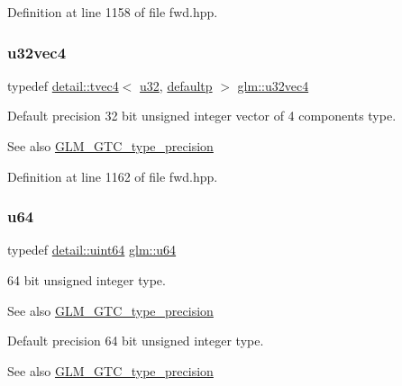 Definition at line 1158 of file fwd.\+hpp.

\mbox{\label{group__gtc__type__precision_ga7e4574f8327a2f576baf2617343d0170}} 
\subsubsection{\texorpdfstring{u32vec4}{u32vec4}}
{\footnotesize\ttfamily typedef \hyperlink{structglm_1_1detail_1_1tvec4}{detail\+::tvec4}$<$ \hyperlink{group__gtc__type__precision_ga54e837745059fd29017bed71cfa0a8db}{u32}, \hyperlink{namespaceglm_a0f04f086094c747d227af4425893f545a9d21ccd8b5a009ec7eb7677befc3bf51}{defaultp} $>$ \hyperlink{group__gtc__type__precision_ga7e4574f8327a2f576baf2617343d0170}{glm\+::u32vec4}}

Default precision 32 bit unsigned integer vector of 4 components type. \begin{DoxySeeAlso}{See also}
\hyperlink{group__gtc__type__precision}{G\+L\+M\+\_\+\+G\+T\+C\+\_\+type\+\_\+precision} 
\end{DoxySeeAlso}


Definition at line 1162 of file fwd.\+hpp.

\mbox{\label{group__gtc__type__precision_ga71cedd4972f9cb1a5e14dfe5ab83ecd7}} 
\subsubsection{\texorpdfstring{u64}{u64}}
{\footnotesize\ttfamily typedef \hyperlink{namespaceglm_1_1detail_adec4b19bf4982125e122db2fe03c5810}{detail\+::uint64} \hyperlink{group__gtc__type__precision_ga71cedd4972f9cb1a5e14dfe5ab83ecd7}{glm\+::u64}}

64 bit unsigned integer type. \begin{DoxySeeAlso}{See also}
\hyperlink{group__gtc__type__precision}{G\+L\+M\+\_\+\+G\+T\+C\+\_\+type\+\_\+precision}
\end{DoxySeeAlso}
Default precision 64 bit unsigned integer type. \begin{DoxySeeAlso}{See also}
\hyperlink{group__gtc__type__precision}{G\+L\+M\+\_\+\+G\+T\+C\+\_\+type\+\_\+precision} 
\end{DoxySeeAlso}


